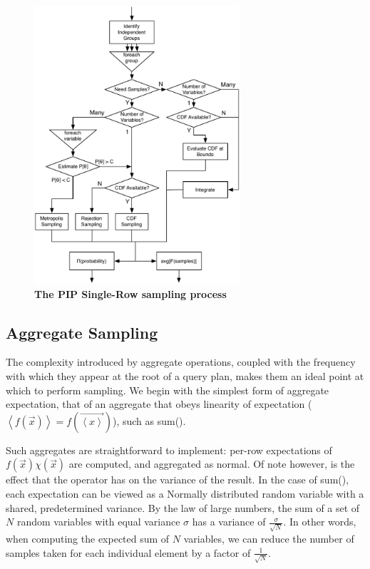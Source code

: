 \begin{figure}
\begin{center}
\includegraphics[width=3in]{graphics/roadmap.pdf}
\caption{\textbf{The PIP Single-Row sampling process}}
\label{fig:roadmap}
\end{center}
\end{figure}

\subsection{Aggregate Sampling}
The complexity introduced by aggregate operations, coupled with the frequency with which they appear at the root of a query plan, makes them an ideal point at which to perform sampling.  We begin with the simplest form of aggregate expectation, that of an aggregate that obeys linearity of expectation ($\left<f(\vec{x})\right> = f(\vec{\left<x\right>})$), such as sum().  

Such aggregates are straightforward to implement: per-row expectations of $f(\vec x)\chi(\vec x)$ are computed, and aggregated as normal.  Of note however, is the effect that the operator has on the variance of the result.  In the case of sum(), each expectation can be viewed as a Normally distributed random variable with a shared, predetermined variance.  By the law of large numbers, the sum of a set of $N$ random variables with equal variance $\sigma$ has a variance of $\frac{\sigma}{\sqrt{N}}$.  In other words, when computing the expected sum of $N$ variables, we can reduce the number of samples taken for each individual element by a factor of $\frac{1}{\sqrt{N}}$.

